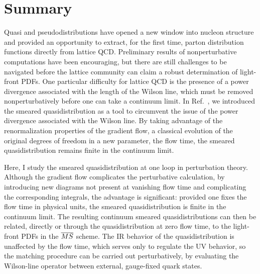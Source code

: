 \section{\label{sec:summary}Summary}

Quasi and pseudodistributions have opened a new window into nucleon structure and provided an opportunity to extract, for the first time, parton distribution functions directly from lattice QCD. Preliminary results of nonperturbative computations have been encouraging, but there are still challenges to be navigated before the lattice community can claim a robust determination of light-front PDFs. One particular difficulty for lattice QCD is the presence of a power divergence associated with the length of the Wilson line, which must be removed nonperturbatively before one can take a continuum limit. In Ref.~\cite{Monahan:2016bvm}, we introduced the smeared quasidistribution as a tool to circumvent the issue of the power divergence associated with the Wilson line. By taking advantage of the renormalization properties of the gradient flow, a classical evolution of the original degrees of freedom in a new parameter, the flow time, the smeared quasidistribution remains finite in the continuum limit.

Here, I study the smeared quasidistribution at one loop in perturbation theory. Although the gradient flow complicates the perturbative calculation, by introducing new diagrams not present at vanishing flow time and complicating the corresponding integrals, the advantage is significant: provided one fixes the flow time in physical units, the smeared quasidistribution is finite in the continuum limit. The resulting continuum smeared quasidistributions can then be related, directly or through the quasidistribution at zero flow time, to the light-front PDFs in the $\overline{MS}$ scheme. The IR behavior of the quasidistribution is unaffected by the flow time, which serves only to regulate the UV behavior, so the matching procedure can be carried out perturbatively, by evaluating the Wilson-line operator between external, gauge-fixed quark states.

